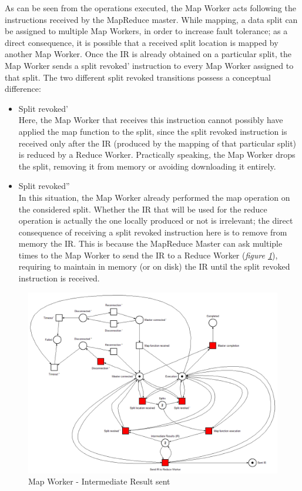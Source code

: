 As can be seen from the operations executed, the Map Worker acts following the instructions received by the MapReduce master. While mapping, a data split can be assigned to multiple Map Workers, in order to increase fault tolerance; as a direct consequence, it is possible that a received split location is mapped by another Map Worker. Once the IR is already obtained on a particular split, the Map Worker sends a split revoked' instruction to every Map Worker assigned to that split. The two different split revoked transitions possess a conceptual difference:
\begin{itemize}
    \item Split revoked'\\
    Here, the Map Worker that receives this instruction cannot possibly have applied the map function to the split, since the split revoked instruction is received only after the IR (produced by the mapping of that particular split) is reduced by a Reduce Worker. Practically speaking, the Map Worker drops the split, removing it from memory or avoiding downloading it entirely.
    \item Split revoked''\\
    In this situation, the Map Worker already performed the map operation on the considered split. Whether the IR that will be used for the reduce operation is actually the one locally produced or not is irrelevant; the direct consequence of receiving a split revoked instruction here is to remove from memory the IR. This is because the MapReduce Master can ask multiple times to the Map Worker to send the IR to a Reduce Worker (\textit{figure \ref{fig:map_worker_petri_net_3}}), requiring to maintain in memory (or on disk) the IR until the split revoked instruction is received.
\end{itemize}

\vspace{2mm}

\begin{figure}[!ht]
    \centering
    \includegraphics[width=\linewidth]{document/chapters/chapter_6/images/map_worker_petri_net_3.png}
    \caption{Map Worker - Intermediate Result sent}
    \label{fig:map_worker_petri_net_3}
\end{figure}

